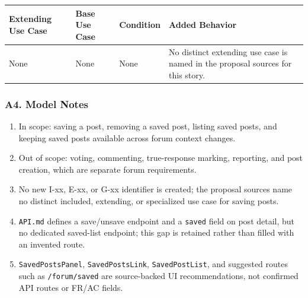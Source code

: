 \documentclass[12pt]{article}
\renewcommand{\baselinestretch}{1.5}
\begin{document}
\begingroup
\small
\renewcommand{\baselinestretch}{1.0}\selectfont
\renewcommand{\arraystretch}{1.15}
\setlength{\tabcolsep}{6pt}
\begin{longtable}{|>{\raggedright\arraybackslash}p{}|>{\raggedright\arraybackslash}p{}|>{\raggedright\arraybackslash}p{}|>{\raggedright\arraybackslash}p{}|}
\hline
\textbf{Extending Use Case} & \textbf{Base Use Case} & \textbf{Condition} & \textbf{Added Behavior} \\ \hline
\endhead
None & None & None & No distinct extending use case is named in the proposal sources for this story. \\ \hline
\end{longtable}
\endgroup
\par\medskip

\hypertarget{sec:a4-model-notes}{}
\subsubsection*{A4. Model Notes}
\par\medskip

\begin{enumerate}
\item In scope: saving a post, removing a saved post, listing saved posts, and keeping saved posts available across forum context changes.
\item Out of scope: voting, commenting, true-response marking, reporting, and post creation, which are separate forum requirements.
\item No new I-xx, E-xx, or G-xx identifier is created; the proposal sources name no distinct included, extending, or specialized use case for saving posts.
\item \texttt{API.md} defines a save/unsave endpoint and a \texttt{saved} field on post detail, but no dedicated saved-list endpoint; this gap is retained rather than filled with an invented route.
\item \texttt{SavedPostsPanel}, \texttt{SavedPostsLink}, \texttt{SavedPostList}, and suggested routes such as \texttt{/forum/saved} are source-backed UI recommendations, not confirmed API routes or FR/AC fields.
\end{enumerate}
\par\medskip

\hypertarget{sec:part-b-use-case-specification}{}
\end{document}
